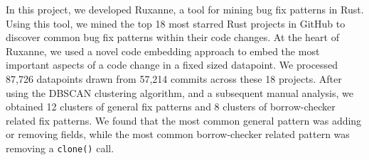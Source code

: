 In this project, we developed Ruxanne, a tool for mining bug fix patterns in Rust. Using this tool, we mined the top 18 most starred Rust projects in GitHub to discover common bug fix patterns within their code changes. At the heart of Ruxanne, we used a novel code embedding approach to embed the most important aspects of a code change in a fixed sized datapoint. We processed 87,726 datapoints drawn from 57,214 commits across these 18 projects. After using the DBSCAN clustering algorithm, and a subsequent manual analysis, we obtained 12 clusters of general fix patterns and 8 clusters of borrow-checker related fix patterns. We found that the most common general pattern was adding or removing fields, while the most common borrow-checker related pattern was removing a \texttt{clone()} call.
